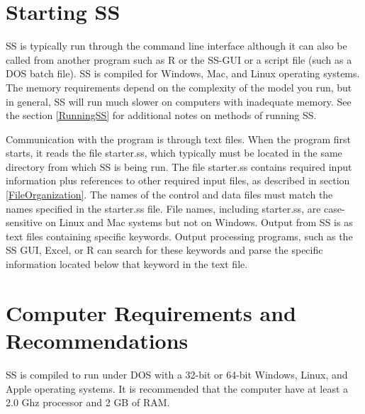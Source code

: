 \section{Starting SS}
SS is typically run through the command line interface although it can also be called from another program such as R or the SS-GUI or a script file (such as a DOS batch file). SS is compiled for Windows, Mac, and Linux operating systems. The memory requirements depend on the complexity of the model you run, but in general, SS will run much slower on computers with inadequate memory. See the section \ref{RunningSS} for additional notes on methods of running SS.

Communication with the program is through text files.  When the program first starts, it reads the file starter.ss, which typically must be located in the same directory from which SS is being run.  The file starter.ss contains required input information plus references to other required input files, as described in section \ref{FileOrganization}.  The names of the control and data files must match the names specified in the starter.ss file.  File names, including starter.ss, are case-sensitive on Linux and Mac systems but not on Windows. Output from SS is as text files containing specific keywords.  Output processing programs, such as the SS GUI, Excel, or R can search for these keywords and parse the specific information located below that keyword in the text file.



\section{Computer Requirements and Recommendations}
SS is compiled to run under DOS with a 32-bit or 64-bit Windows, Linux, and Apple operating systems.  It is recommended that the computer have at least a 2.0 Ghz processor and 2 GB of RAM. 